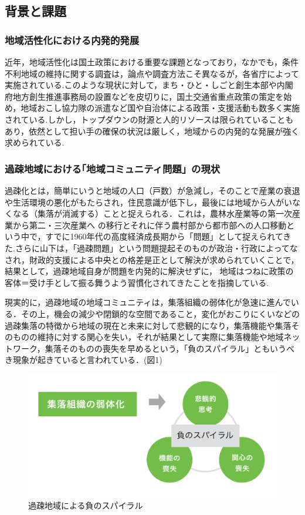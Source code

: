 \documentclass[a4paper]{jsarticle}
\begin{document}
\subsection{背景と課題}
\subsubsection{地域活性化における内発的発展}
近年，地域活性化は国土政策における重要な課題となっており，なかでも，条件不利地域の維持に関する調査は，論点や調査方法こそ異なるが，各省庁によって実施されている.このような現状に対して，まち・ひと・しごと創生本部や内閣府地方創生推進事務局の設置などを皮切りに，国土交通省重点政策\cite{2}の策定を始め，地域おこし協力隊の派遣など国や自治体による政策・支援活動も数多く実施されている.しかし，トップダウンの財源と人的リソースは限られていることもあり，依然として担い手の確保の状況は厳しく，地域からの内発的な発展が強く求められている.
\subsubsection{過疎地域における｢地域コミュニティ問題」の現状}
過疎化とは，簡単にいうと地域の人口（戸数）が急減し，そのことで産業の衰退や生活環境の悪化がもたらされ，住民意識が低下し，最後には地域から人がいなくなる（集落が消滅する）ことと捉えられる．\cite{3}これは，農林水産業等の第一次産業から第二・三次産業へ の移行とそれに伴う農村部から都市部への人口移動という中で，すでに1960年代の高度経済成長期から「問題」として捉えられてきた.\cite{4}さらに山下は，「過疎問題」という問題提起そのものが政治・行政によってなされ，財政的支援による中央との格差是正として解決が求められていくことで，結果として，過疎地域自身が問題を内発的に解決せずに， 地域はつねに政策の客体＝受け手として振る舞うよう習慣化されてきたことを指摘している.\cite{5}\par
現実的に，過疎地域の地域コミュニティは，集落組織の弱体化が急速に進んでいる．その上，機会の減少や閉鎖的な空間であること，変化がおこりにくいなどの過疎集落の特徴から地域の現在と未来に対して悲観的になり，集落機能や集落そのものの維持に対する関心を失い，それが結果として実際に集落機能や地域ネットワーク，集落そのものの喪失を早めるという，「負のスパイラル」ともいうべき現象が起きていると言われている．(図1)\cite{6}\par
\begin{figure}[H]
  \begin{center}
    \includegraphics[width=1.0\hsize]{./images/17.png}
    \caption{過疎地域による負のスパイラル}
    \label{fig:tmu_hino}
  \end{center}
\end{figure}
\end{document}
